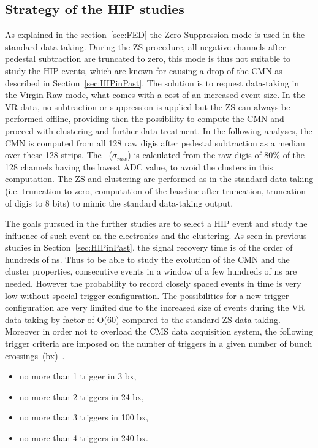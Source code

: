 \subsection{Strategy of the HIP studies~\label{sec:strategy}}

As explained in the section~\ref{sec:FED} the Zero Suppression mode is used in the standard data-taking. During the ZS procedure, all negative channels after pedestal subtraction are truncated to zero, this mode is thus not suitable to study the HIP events, which are known for causing a drop of the CMN as described in Section~\ref{sec:HIPinPast}. The solution is to request data-taking in the Virgin Raw mode, what comes with a cost of an increased event size. In the VR data, no subtraction or suppression is applied but the ZS can always be performed offline, providing then the possibility to compute the CMN and proceed with clustering and further data treatment. In the following analyses, the CMN is computed from all 128 raw digis after pedestal subtraction as a median over these 128 strips. The \SD~($\sigma_{raw}$) is calculated from the raw digis of 80\% of the 128 channels having the lowest ADC value, to avoid the clusters in this computation. The ZS and clustering are performed as in the standard data-taking (i.e. truncation to zero, computation of the baseline after truncation, truncation of digis to 8 bits) to mimic the standard data-taking output.

The goals pursued in the further studies are to select a HIP event and study the influence of such event on the electronics and the clustering. As seen in previous studies in Section~\ref{sec:HIPinPast}, the signal recovery time is of the order of hundreds of ns. Thus to be able to study the evolution of the CMN and the cluster properties, consecutive events in a window of a few hundreds of ns are needed. However the probability to record closely spaced events in time is very low without special trigger configuration. The possibilities for a new trigger configuration are very limited due to the increased size of events during the VR data-taking by factor of O(60) compared to the standard ZS data taking. Moreover in order not to overload the CMS data acquisition system, the following trigger criteria are imposed on the number of triggers in a given number of bunch crossings~(bx)~\cite{website:VRtrigger}.

\begin{itemize}
\item{no more than 1 trigger in 3 bx,}
\item{no more than 2 triggers in 24 bx,}
\item{no more than 3 triggers in 100 bx,}
\item{no more than 4 triggers in 240 bx.}
\end{itemize}

